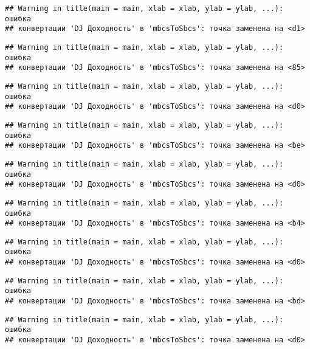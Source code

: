 \documentclass[
]{article}
\begin{document}
\begin{verbatim}
## Warning in title(main = main, xlab = xlab, ylab = ylab, ...): ошибка
## конвертации 'DJ Доходность' в 'mbcsToSbcs': точка заменена на <d1>
\end{verbatim}

\begin{verbatim}
## Warning in title(main = main, xlab = xlab, ylab = ylab, ...): ошибка
## конвертации 'DJ Доходность' в 'mbcsToSbcs': точка заменена на <85>
\end{verbatim}

\begin{verbatim}
## Warning in title(main = main, xlab = xlab, ylab = ylab, ...): ошибка
## конвертации 'DJ Доходность' в 'mbcsToSbcs': точка заменена на <d0>
\end{verbatim}

\begin{verbatim}
## Warning in title(main = main, xlab = xlab, ylab = ylab, ...): ошибка
## конвертации 'DJ Доходность' в 'mbcsToSbcs': точка заменена на <be>
\end{verbatim}

\begin{verbatim}
## Warning in title(main = main, xlab = xlab, ylab = ylab, ...): ошибка
## конвертации 'DJ Доходность' в 'mbcsToSbcs': точка заменена на <d0>
\end{verbatim}

\begin{verbatim}
## Warning in title(main = main, xlab = xlab, ylab = ylab, ...): ошибка
## конвертации 'DJ Доходность' в 'mbcsToSbcs': точка заменена на <b4>
\end{verbatim}

\begin{verbatim}
## Warning in title(main = main, xlab = xlab, ylab = ylab, ...): ошибка
## конвертации 'DJ Доходность' в 'mbcsToSbcs': точка заменена на <d0>
\end{verbatim}

\begin{verbatim}
## Warning in title(main = main, xlab = xlab, ylab = ylab, ...): ошибка
## конвертации 'DJ Доходность' в 'mbcsToSbcs': точка заменена на <bd>
\end{verbatim}

\begin{verbatim}
## Warning in title(main = main, xlab = xlab, ylab = ylab, ...): ошибка
## конвертации 'DJ Доходность' в 'mbcsToSbcs': точка заменена на <d0>
\end{verbatim}
\end{document}
